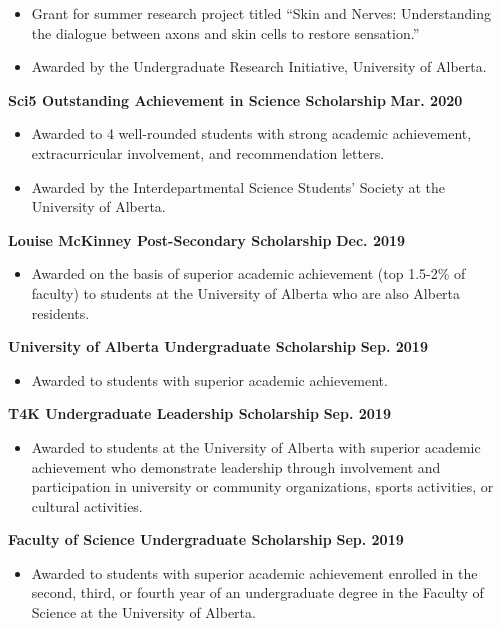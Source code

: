 \documentclass{article}
\begin{document}
    \begin{itemize}
        \item Grant for summer research project titled ``Skin and Nerves: Understanding the dialogue between axons and skin cells to restore sensation.''
        \item Awarded by the Undergraduate Research Initiative, University of Alberta.
    \end{itemize}
    \textbf{Sci5 Outstanding Achievement in Science Scholarship} \hfill \textbf{Mar. 2020}
    \begin{itemize}
        \item Awarded to 4 well-rounded students with strong academic achievement, extracurricular involvement, and recommendation letters.
        \item Awarded by the Interdepartmental Science Students' Society at the University of Alberta.
    \end{itemize}
    \textbf{Louise McKinney Post-Secondary Scholarship} \hfill \textbf{Dec. 2019}
        \begin{itemize}
            \item Awarded on the basis of superior academic achievement (top 1.5-2\% of faculty) to students at the University of Alberta who are also Alberta residents.
        \end{itemize}
    \textbf{University of Alberta Undergraduate Scholarship} \hfill \textbf{Sep. 2019}
        \begin{itemize}
            \item Awarded to students with superior academic achievement.
        \end{itemize}
    \textbf{T4K Undergraduate Leadership Scholarship} \hfill \textbf{Sep. 2019}
        \begin{itemize}
            \item Awarded to students at the University of Alberta with superior academic achievement who demonstrate leadership through involvement and participation in university or community organizations, sports activities, or cultural activities.
        \end{itemize}
    \textbf{Faculty of Science Undergraduate Scholarship} \hfill \textbf{Sep. 2019}
        \begin{itemize}
            \item Awarded to students with superior academic achievement enrolled in the second, third, or fourth year of an undergraduate degree in the Faculty of Science at the University of Alberta.
        \end{itemize}
\end{document}
